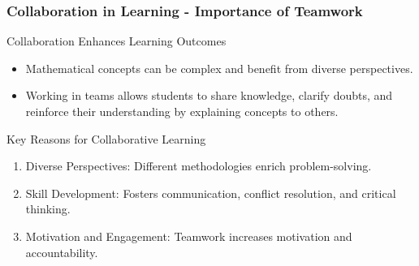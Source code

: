 \documentclass[aspectratio=169]{beamer}
\begin{document}
\begin{frame}[fragile]
    \frametitle{Collaboration in Learning - Importance of Teamwork}
    
    \begin{block}{Collaboration Enhances Learning Outcomes}
        \begin{itemize}
            \item Mathematical concepts can be complex and benefit from diverse perspectives.
            \item Working in teams allows students to share knowledge, clarify doubts, and reinforce their understanding by explaining concepts to others.
        \end{itemize}
    \end{block}
    
    \begin{block}{Key Reasons for Collaborative Learning}
        \begin{enumerate}
            \item Diverse Perspectives: Different methodologies enrich problem-solving.
            \item Skill Development: Fosters communication, conflict resolution, and critical thinking.
            \item Motivation and Engagement: Teamwork increases motivation and accountability.
        \end{enumerate}
    \end{block}
\end{frame}
\end{document}
